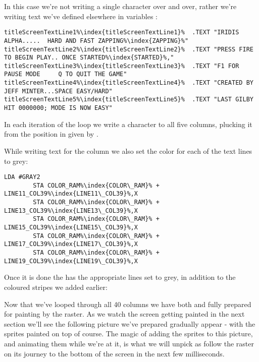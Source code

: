 In this case we're not writing a single character over and over, rather we're writing text we've defined elsewhere
in variables :

\begin{lstlisting}[caption=In \icode{DrawTitleScreenText\index{DrawTitleScreenText}},escapechar=\%]
titleScreenTextLine1%\index{titleScreenTextLine1}%  .TEXT "IRIDIS ALPHA.....  HARD AND FAST ZAPPING%\index{ZAPPING}%"
titleScreenTextLine2%\index{titleScreenTextLine2}%  .TEXT "PRESS FIRE TO BEGIN PLAY.. ONCE STARTED%\index{STARTED}%,"
titleScreenTextLine3%\index{titleScreenTextLine3}%  .TEXT "F1 FOR PAUSE MODE     Q TO QUIT THE GAME"
titleScreenTextLine4%\index{titleScreenTextLine4}%  .TEXT "CREATED BY JEFF MINTER...SPACE EASY/HARD"
titleScreenTextLine5%\index{titleScreenTextLine5}%  .TEXT "LAST GILBY HIT 0000000; MODE IS NOW EASY"
\end{lstlisting}

In each iteration of the loop we write a character to all five columns, plucking it from the position in
 given by . 



While writing text for the column we also set the color for each of the text lines to grey:

\begin{lstlisting}[caption=In \icode{DrawTitleScreenText\index{DrawTitleScreenText}},escapechar=\%]
        LDA #GRAY2
        STA COLOR_RAM%\index{COLOR\_RAM}% + LINE11_COL39%\index{LINE11\_COL39}%,X
        STA COLOR_RAM%\index{COLOR\_RAM}% + LINE13_COL39%\index{LINE13\_COL39}%,X
        STA COLOR_RAM%\index{COLOR\_RAM}% + LINE15_COL39%\index{LINE15\_COL39}%,X
        STA COLOR_RAM%\index{COLOR\_RAM}% + LINE17_COL39%\index{LINE17\_COL39}%,X
        STA COLOR_RAM%\index{COLOR\_RAM}% + LINE19_COL39%\index{LINE19\_COL39}%,X
\end{lstlisting}

Once it is done the  has the appropriate lines set to grey, in addition to the coloured stripes
we added earlier:


Now that we've looped through all 40 columns we have both  and  fully
prepared for painting by the raster. As we watch the screen getting painted in the next section we'll see
the following picture we've prepared gradually appear - with the sprites painted on top of course. The
magic of adding the sprites to this picture, and animating them while we're at it, is what we will
unpick as follow the raster on its journey to the bottom of the screen in the next few milliseconds.

